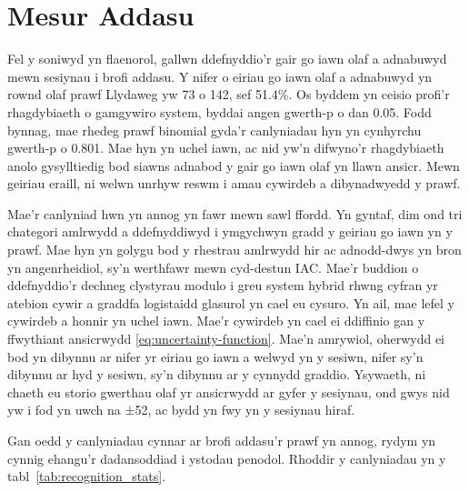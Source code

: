 \section{Mesur Addasu}
Fel y soniwyd yn flaenorol, gallwn ddefnyddio'r gair go iawn olaf a adnabuwyd mewn sesiynau i brofi addasu. Y nifer o eiriau go iawn olaf a adnabuwyd yn rownd olaf prawf Llydaweg yw 73 o 142, sef 51.4\%. Os byddem yn ceisio profi'r rhagdybiaeth o gamgywiro system, byddai angen gwerth-p o dan 0.05. Fodd bynnag, mae rhedeg prawf binomial gyda'r canlyniadau hyn yn cynhyrchu gwerth-p o 0.801. Mae hyn yn uchel iawn, ac nid yw'n difwyno'r rhagdybiaeth anolo gysylltiedig bod siawns adnabod y gair go iawn olaf yn llawn ansicr. Mewn geiriau eraill, ni welwn unrhyw reswm i amau cywirdeb a dibynadwyedd y prawf.

Mae'r canlyniad hwn yn annog yn fawr mewn sawl ffordd. Yn gyntaf, dim ond tri chategori amlrwydd a ddefnyddiwyd i ymgychwyn gradd y geiriau go iawn yn y prawf. Mae hyn yn golygu bod y rhestrau amlrwydd hir ac adnodd-dwys yn bron yn angenrheidiol, sy'n werthfawr mewn cyd-destun IAC. Mae'r buddion o ddefnyddio'r dechneg clystyrau modulo i greu system hybrid rhwng cyfran yr atebion cywir a graddfa logistaidd glasurol yn cael eu cysuro. Yn ail, mae lefel y cywirdeb a honnir yn uchel iawn. Mae'r cywirdeb yn cael ei ddiffinio gan y ffwythiant ansicrwydd \ref{eq:uncertainty-function}. Mae'n amrywiol, oherwydd ei bod yn dibynnu ar nifer yr eiriau go iawn a welwyd yn y sesiwn, nifer sy'n dibynnu ar hyd y sesiwn, sy'n dibynnu ar y cynnydd graddio. Ysywaeth, ni chaeth eu storio gwerthau olaf yr ansicrwydd ar gyfer y sesiynau, ond gwys nid yw i fod yn uwch na ±52, ac bydd yn fwy yn y sesiynau hiraf.

Gan oedd y canlyniadau cynnar ar brofi addasu'r prawf yn annog, rydym yn cynnig ehangu'r dadansoddiad i ystodau penodol. Rhoddir y canlyniadau yn y tabl~\ref{tab:recognition_stats}.


